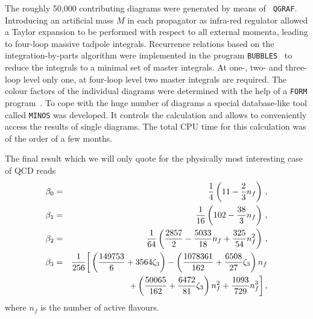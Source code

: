The roughly 50,000 contributing diagrams were generated by means of {\tt
  QGRAF}.  Introducing an artificial mass $M$ in each propagator as
infra-red regulator allowed a Taylor expansion to be performed with
respect to all external momenta, leading to four-loop massive tadpole
integrals.  Recurrence relations based on the integration-by-parts
algorithm were implemented in the program {\tt BUBBLES}~\cite{bubbles}
to reduce the integrals to a minimal set of master integrals. At one-,
two- and three-loop level only one, at four-loop level two master
integrals are required.  The colour factors of the individual diagrams
were determined with the help of a {\tt FORM} program~\cite{color}.  To
cope with the huge number of diagrams a special database-like tool
called {\tt MINOS} was developed. It controls the calculation and allows
to conveniently access the results of single diagrams.  The total CPU
time for this calculation was of the order of a few months.
 
The final result which we will only quote for the physically most
interesting case of QCD reads
\begin{eqnarray}
\renewcommand{\arraystretch}{ 1.3}
 \beta_0 & = & {1\over 4}\left(11 - \frac{2}{3} n_f \right)\,,  \nonumber\\
\beta_1 & = & {1\over 16}\left( 102 - \frac{38}{3} n_f \right)\,, \nonumber \\
 \beta_2 & = & {1\over 64}\left( \frac{2857}{2} - \frac{5033}{18} n_f +
 \frac{325}{54} n_f^2 \right)\,, \nonumber \\
 \beta_3 & = &  {1\over 256} \bigg[
 \left( \frac{149753}{6} + 3564 \zeta_3 \right)
        - \left( \frac{1078361}{162} + \frac{6508}{27} \zeta_3 \right) n_f
  \nonumber \\ & &
       + \left( \frac{50065}{162} + \frac{6472}{81} \zeta_3 \right) n_f^2
       +  \frac{1093}{729}  n_f^3
       \bigg]\,,
\end{eqnarray}
where $n_f$ is the number of active flavours.

